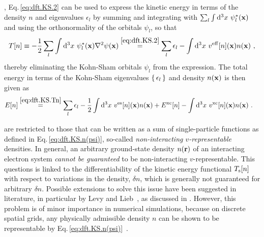 , Eq.\,\eqref{eq:dft.KS.2} can be used to express the kinetic energy in terms of the density $n$ and eigenvalues $\epsilon_l$ by summing and integrating with $\sum_l \int {\rm d}^3 x~\psi^\ast_l ({\bf x})$ and using the orthonormality of the orbitals $\psi_l$, so that
\begin{align}
	T[n] 
		\equiv - \frac{1}{2}\sum_l \int \d^3 x ~ \psi^\ast_l ({\bf x}) \nabla^2 \psi({\bf x})
		\stackrel{\eqref{eq:dft.KS.2}}{=} 
			\sum_l \epsilon_l 
			- \int \d^3 x ~ v^{\rm eff}[n] ({\bf x}) n({\bf x})~,
	\label{eq:dft.KS.Tn}
\end{align}
thereby eliminating the Kohn-Sham orbitals $\psi_l$ from the expression.
The total energy in terms of the Kohn-Sham eigenvalues $\set{\epsilon_l}$ and density $n ({\bf x})$  %
is then given as
\begin{align}
	E[n]
		&\stackrel{\eqref{eq:dft.KS.Tn}}{=}
			\sum_l \epsilon_l 
			- \frac{1}{2} \int \d^3 x ~ v^{\rm es} [n] ({\bf x}) n ({\bf x})
			+ E^{\rm xc}[n]
			- \int \d^3 x ~ v^{\rm xc}[n] ({\bf x}) n ({\bf x})~.
	\label{eq:dft.KS.En}
\end{align}

 are restricted to those that can be written as a sum of single-particle functions as defined in Eq.\,\eqref{eq:dft.KS.n(psi)}, so-called \emph{non-interacting $v$-representable} densities. In general, an arbitrary ground-state density $n ({\bf r})$ of an interacting electron system \emph{cannot be guaranteed} to be non-interacting $v$-representable. This questions is linked to the differentiability of the kinetic energy functional $T_{\rm s} [n]$ with respect to variations in the density, $\delta n$, which is generally not guaranteed for arbitrary $\delta n$. Possible extensions to solve this issue have been suggested in literature, in particular by Levy and Lieb~\cite{Levy.1979,Lieb.1983,Englisch.1984a,Englisch.1984b}, as discussed in \cite[Chp.\,4.2]{Dreizler2012}. However, this problem is of minor importance in numerical simulations, because on discrete spatial grids, any physically admissible density $n$ can be shown to be representable by Eq.\,\eqref{eq:dft.KS.n(psi)}~\cite{Chayes.1985}. 


